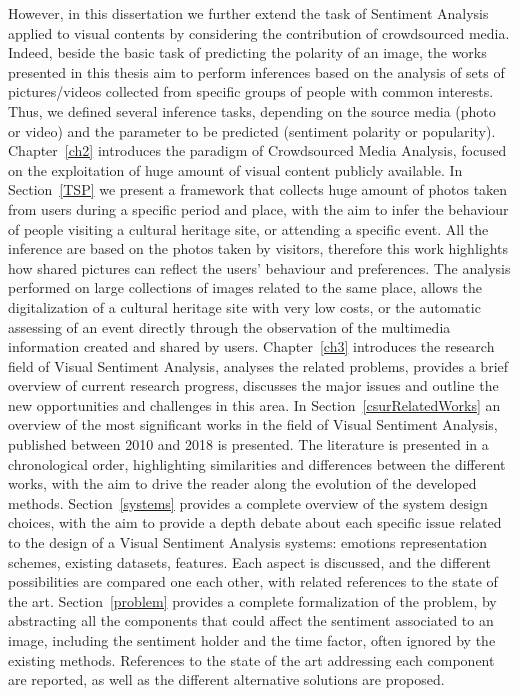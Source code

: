 However, in this dissertation we further extend the task of Sentiment Analysis applied to visual contents by considering the contribution of crowdsourced media. Indeed, beside the basic task of predicting the polarity of an image, the works presented in this thesis aim to perform inferences based on the analysis of sets of pictures/videos collected from specific groups of people with common interests. Thus, we defined several inference tasks, depending on the source media (photo or video) and the parameter to be predicted (sentiment polarity or popularity). 
Chapter~\ref{ch2} introduces the paradigm of Crowdsourced Media Analysis, focused on the exploitation of huge amount of visual content publicly available.
In Section~\ref{TSP} we present a framework that collects huge amount of photos taken from users during a specific period and place, with the aim to infer the behaviour of people visiting a cultural heritage site, or attending a specific event. All the inference are based on the photos taken by visitors, therefore this work highlights how shared pictures can reflect the users' behaviour and preferences. The analysis performed on large collections of images related to the same place, allows the digitalization of a cultural heritage site with very low costs, or the automatic assessing of an event directly through the observation of the multimedia information created and shared by users. 
Chapter~\ref{ch3} introduces the research field of Visual Sentiment Analysis, analyses the related problems, provides a brief overview of current research progress, discusses the major issues and outline the new opportunities and challenges in this area.
In Section~\ref{csurRelatedWorks} an overview of the most significant works in the field of Visual Sentiment Analysis, published between 2010 and 2018 is presented. The literature is presented in a chronological order, highlighting similarities and differences between the different works, with the aim to drive the reader along the evolution of the developed methods.
Section~\ref{systems} provides a complete overview of the system design choices, with the aim to provide a depth debate about each specific issue related to the design of a Visual Sentiment Analysis systems: emotions representation schemes, existing datasets, features. Each aspect is discussed, and the different possibilities are compared one each other, with related references to the state of the art.
Section~\ref{problem} provides a complete formalization of the problem, by abstracting all the components that could affect the sentiment associated to an image, including the sentiment holder and the time factor, often ignored by the existing methods. References to the state of the art addressing each component are reported, as well as the different alternative solutions are proposed.
